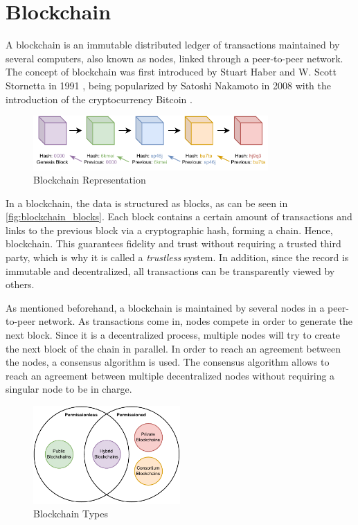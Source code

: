 \section{Blockchain}\label{background:blockchain}

A blockchain is an immutable distributed ledger of transactions maintained by several computers, also known as nodes, linked through a peer-to-peer network. The concept of blockchain was first introduced by Stuart Haber and W. Scott Stornetta in 1991 \cite{10.48550/ARXIV.1810.06130}, being popularized by Satoshi Nakamoto in 2008 with the introduction of the cryptocurrency Bitcoin \cite{nakamoto2009bitcoin}.

\begin{figure}[h]
    \centering
    \includegraphics[width=0.8\textwidth]{graphics/blockchain.pdf}
    \caption{Blockchain Representation}
    \label{fig:blockchain_blocks}
\end{figure}

In a blockchain, the data is structured as blocks, as can be seen in \autoref{fig:blockchain_blocks}. Each block contains a certain amount of transactions and links to the previous block via a cryptographic hash, forming a chain. Hence, blockchain. This guarantees fidelity and trust without requiring a trusted third party, which is why it is called a \textit{trustless} system. In addition, since the record is immutable and decentralized, all transactions can be transparently viewed by others.

As mentioned beforehand, a blockchain is maintained by several nodes in a peer-to-peer network. As transactions come in, nodes compete in order to generate the next block. Since it is a decentralized process, multiple nodes will try to create the next block of the chain in parallel. In order to reach an agreement between the nodes, a consensus algorithm is used. The consensus algorithm allows to reach an agreement between multiple decentralized nodes without requiring a singular node to be in charge.

\begin{figure}[h]
    \centering
    \includegraphics[width=0.5\textwidth]{graphics/blockchain-types.pdf}
    \caption{Blockchain Types}
    \label{fig:blockchain_types}
\end{figure}

